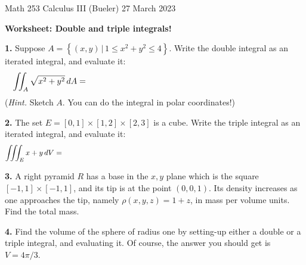 \documentclass[11pt]{amsart}
\newcommand{\prob}[1]{\bigskip\noindent\textbf{#1.}\quad }
\begin{document}
\scriptsize \noindent Math 253 Calculus III (Bueler) \hfill 27 March 2023 
\normalsize\medskip

\Large\centerline{\textbf{Worksheet: Double and triple integrals!}}
\medskip
\normalsize

\thispagestyle{empty}

\bigskip

\prob{1}  Suppose $A = \left\{(x,y)\,|\, 1 \le x^2 + y^2 \le 4\right\}$.  Write the double integral as an iterated integral, and evaluate it:
$$\iint_A \sqrt{x^2+y^2}\,dA = \hspace{3.5in}$$
(\emph{Hint.} Sketch $A$.  You can do the integral in polar coordinates!)
\vfill

\prob{2}  The set $E = [0,1]\times[1,2]\times[2,3]$ is a cube.  Write the triple integral as an iterated integral, and evaluate it:
$$\iiint_E x + y\,dV = \hspace{4.5in}$$
\vfill

\clearpage\newpage
\prob{3}  A right pyramid $R$ has a base in the $x,y$ plane which is the square $[-1,1]\times[-1,1]$, and its tip is at the point $(0,0,1)$.  Its density increases as one approaches the tip, namely $\rho(x,y,z) = 1 + z$, in mass per volume units.  Find the total mass.
\vfill

\prob{4}  Find the volume of the sphere of radius one by setting-up either a double or a triple integral, and evaluating it.  Of course, the answer you should get is $V=4\pi/3$.
\vfill
\end{document}
